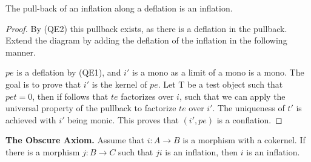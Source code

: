     \begin{corollary}
        The pull-back of an inflation along a deflation is an inflation.
        \begin{center}
        \end{center}
    \end{corollary}

    \begin{proof}
        By (QE2) this pullback exists, as there is a deflation in the pullback. Extend the diagram by adding the deflation of the inflation in the following manner.
        \begin{center}
        \end{center}
        $pe$ is a deflation by (QE1), and $i'$ is a mono as a limit of a mono is a mono. The goal is to prove that $i'$ is the kernel of $pe$. Let T be a test object such that $pet=0$, then if follows that $te$ factorizes over $i$, such that we can apply the universal property of the pullback to factorize $te$ over $i'$. The uniqueness of $t'$ is achieved with $i'$ being monic. This proves that $(i',pe)$ is a conflation.
    \end{proof}

    \begin{theorem}
        \textbf{The Obscure Axiom.} Assume that $i:A\rightarrow B$ is a morphism with a cokernel. If there is a morphism $j:B\rightarrow C$ such that $ji$ is an inflation, then $i$ is an inflation.
    \end{theorem}

